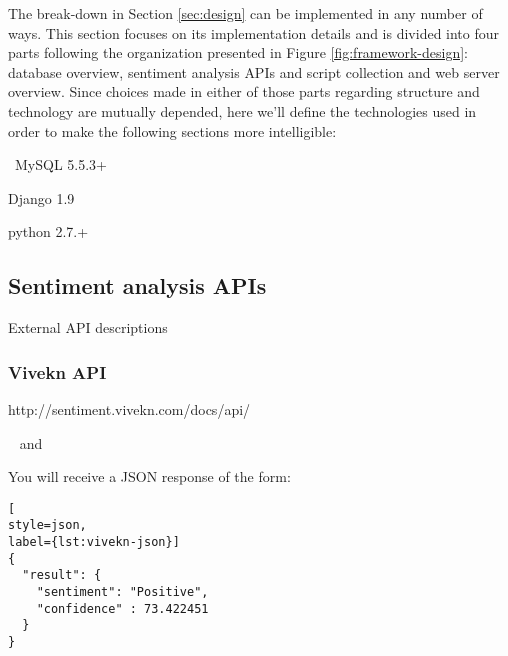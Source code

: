 \newcommand*{\ImplementationPath}{04-framework/02-implementation}

The break-down in Section \ref{sec:design} can be implemented in any number of ways. 
This section focuses on its implementation details and is divided into four parts following the organization presented in Figure \ref{fig:framework-design}: database overview, sentiment analysis APIs and script collection and web server overview. 
Since choices made in either of those parts regarding structure and technology are mutually depended, here we'll define the technologies used in order to make the following sections more intelligible:
\begin{description}
\singlespacing
 \item[DBMS:] MySQL 5.5.3+
 \item[Web framework:] Django 1.9 
 \item[Sentiment analysis scripts:] python 2.7.+
\end{description}



\subsection{Sentiment analysis APIs\label{sec:apis}}
External API descriptions

\subsubsection*{Vivekn API}
\begin{description}
\singlespacing
 \item[Web url:] http://sentiment.vivekn.com/docs/api/
 \item[Database columns:]  and 
\end{description}
You will receive a JSON response of the form:
\begin{lstlisting}[
style=json,
label={lst:vivekn-json}]
{ 
  "result": { 
    "sentiment": "Positive", 
    "confidence" : 73.422451 
  } 
}
\end{lstlisting}

